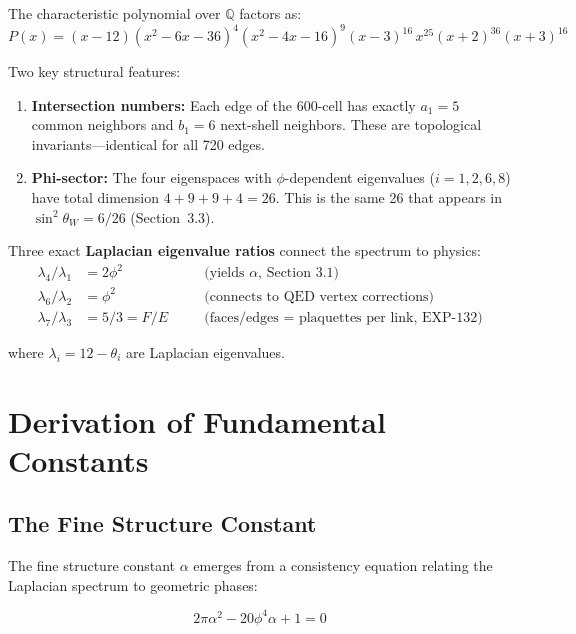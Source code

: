 \documentclass[12pt,a4paper]{article}
\begin{document}
The characteristic polynomial over $\mathbb{Q}$ factors as:
\begin{equation}
P(x) = (x-12)(x^2-6x-36)^4(x^2-4x-16)^9(x-3)^{16}\,x^{25}(x+2)^{36}(x+3)^{16}
\end{equation}

Two key structural features:
\begin{enumerate}
    \item \textbf{Intersection numbers:} Each edge of the 600-cell has exactly $a_1 = 5$ common neighbors and $b_1 = 6$ next-shell neighbors. These are topological invariants---identical for all 720 edges.
    \item \textbf{Phi-sector:} The four eigenspaces with $\phi$-dependent eigenvalues ($i = 1, 2, 6, 8$) have total dimension $4 + 9 + 9 + 4 = 26$. This is the same 26 that appears in $\sin^2\theta_W = 6/26$ (Section~3.3).
\end{enumerate}

Three exact \textbf{Laplacian eigenvalue ratios} connect the spectrum to physics:
\begin{align}
\lambda_4 / \lambda_1 &= 2\phi^2 &\quad &\text{(yields } \alpha \text{, Section~3.1)} \\
\lambda_6 / \lambda_2 &= \phi^2 &\quad &\text{(connects to QED vertex corrections)} \\
\lambda_7 / \lambda_3 &= 5/3 = F/E &\quad &\text{(faces/edges = plaquettes per link, EXP-132)}
\end{align}

where $\lambda_i = 12 - \theta_i$ are Laplacian eigenvalues.

\section{Derivation of Fundamental Constants}

\subsection{The Fine Structure Constant}

The fine structure constant $\alpha$ emerges from a consistency equation relating the Laplacian spectrum to geometric phases:

\begin{equation}
\boxed{2\pi\alpha^2 - 20\phi^4\alpha + 1 = 0}
\end{equation}
\end{document}
